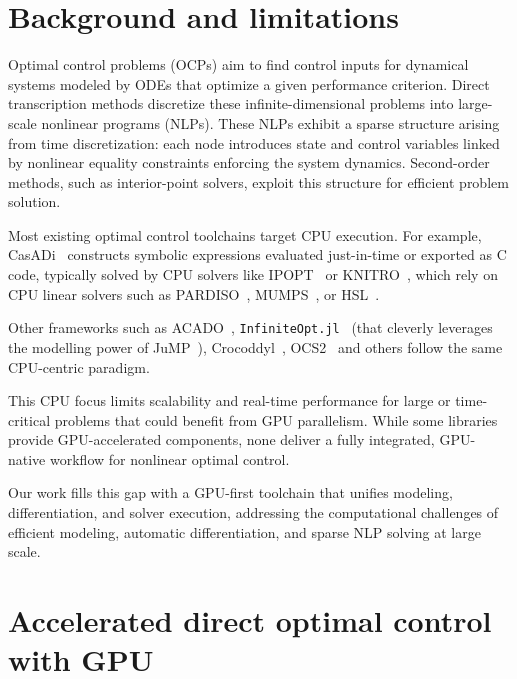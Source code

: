 \documentclass[twoside,leqno,twocolumn]{article}
\begin{document}
\section{Background and limitations}

Optimal control problems (OCPs) aim to find control inputs for dynamical systems modeled by ODEs that optimize a given performance criterion.
Direct transcription methods discretize these infinite-dimensional problems into large-scale nonlinear programs (NLPs).
These NLPs exhibit a sparse structure arising from time discretization: each node introduces state and control variables linked by nonlinear equality constraints enforcing the system dynamics.
Second-order methods, such as interior-point solvers, exploit this structure for efficient problem solution.

Most existing optimal control toolchains target CPU execution.
For example, CasADi~\cite{Andersson2019} constructs symbolic expressions evaluated just-in-time or exported as C code, typically solved by CPU solvers like IPOPT~\cite{wachter2006implementation} or KNITRO~\cite{byrd2006k}, which rely on CPU linear solvers such as PARDISO~\cite{schenk2004solving}, MUMPS~\cite{amestoy2000mumps}, or HSL~\cite{fowkes2024libhsl}.

Other frameworks such as ACADO~\cite{houska2011acado}, 
\texttt{InfiniteOpt.jl}~\cite{pulsipher2022unifying} (that cleverly leverages 
the modelling power of JuMP~\cite{dunning2017jump}),
Crocoddyl~\cite{mastalli2020crocoddyl}, OCS2~\cite{OCS2} and others
follow the same CPU-centric paradigm.

This CPU focus limits scalability and real-time performance for large or time-critical problems that could benefit from GPU parallelism.
While some libraries provide GPU-accelerated components, none deliver a fully integrated, GPU-native workflow for nonlinear optimal control.

Our work fills this gap with a GPU-first toolchain that unifies modeling, differentiation, and solver execution, addressing the computational challenges of efficient modeling, automatic differentiation, and sparse NLP solving at large scale.

\section{Accelerated direct optimal control with GPU}
\end{document}
